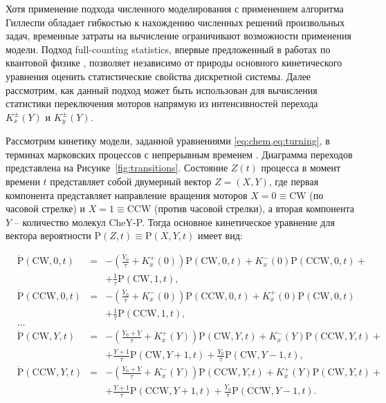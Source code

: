 Хотя применение подхода численного моделирования с применением алгоритма Гиллеспи \cite{gillespie_stochastic_2007} обладает гибкостью к нахождению численных решений произвольных задач, временные затраты на вычисление ограничивают возможности применения модели. Подход full-counting statistics, впервые предложенный в работах по квантовой физике \cite{levitov_electron_1996}, позволяет независимо от природы основного кинетического уравнения оценить статистические свойства дискретной системы. Далее рассмотрим, как данный подход может быть использован для вычисления статистики переключения моторов напрямую из интенсивностей перехода $K_x^\pm(Y)$ и $K_y^\pm(Y)$.

Рассмотрим кинетику модели, заданной уравнениями \cref{eq:chem,eq:turning}, в терминах марковских процессов с непрерывным временем \cite{tikhonov_markov_process_1977}. Диаграмма переходов представлена на Рисунке~\cref{fig:transitions}. Состояние $Z(t)$ процесса в момент времени $t$ представляет собой двумерный вектор $Z = (X, Y)$, где первая компонента представляет направление вращения моторов $X = 0 \equiv \mathrm{CW}$ (по часовой стрелке) и $X = 1 \equiv \mathrm{CCW}$ (против часовой стрелки), а вторая компонента $Y$ -- количество молекул CheY-P. Тогда основное кинетическое уравнение для вектора вероятности $\mathrm{P}(Z, t) \equiv \mathrm{P}(X, Y, t)$ имеет вид:

\begin{equation}
    \begin{aligned}
        &\dot{\mathrm{P}}(\mathrm{CW},0,t)&=&-\left (\frac{Y_0}{\tau} + K_x^+(0) \right ) \mathrm{P}(\mathrm{CW},0,t) + K_x^-(0) \mathrm{P}(\mathrm{CCW},0,t)+&&\\
        &&&+\frac{1}{\tau}\mathrm{P}(\mathrm{CW},1,t),&&\\
        &\dot{\mathrm{P}}(\mathrm{CCW},0,t)&=&-\left (\frac{Y_0}{\tau} + K_x^-(0) \right ) \mathrm{P}(\mathrm{CCW},0,t) + K_x^+(0) \mathrm{P}(\mathrm{CW},0,t)&&\\
        &&&+\frac{1}{\tau}\mathrm{P}(\mathrm{CCW},1,t),&&\\
        &\dots&&\\
        &\dot{\mathrm{P}}(\mathrm{CW},Y,t)&=&-\left (\frac{Y_0+Y}{\tau} + K_x^+(Y) \right ) \mathrm{P}(\mathrm{CW},Y,t) + K_x^-(Y) \mathrm{P}(\mathrm{CCW},Y,t)+&&\\
        &&&+\frac{Y+1}{\tau}\mathrm{P}(\mathrm{CW},Y+1,t)+\frac{Y_0}{\tau}\mathrm{P}(\mathrm{CW},Y-1,t),&&\\
        &\dot{\mathrm{P}}(\mathrm{CCW},Y,t)&=&-\left (\frac{Y_0+Y}{\tau} + K_x^-(Y) \right ) \mathrm{P}(\mathrm{CCW},Y,t) + K_x^+(Y) \mathrm{P}(\mathrm{CW},Y,t)+&&\\
        &&&+\frac{Y+1}{\tau}\mathrm{P}(\mathrm{CCW},Y+1,t)+\frac{Y_0}{\tau}\mathrm{P}(\mathrm{CCW},Y-1,t).&&\\
    \end{aligned}
    \label{eq:master-transitions}
\end{equation}


